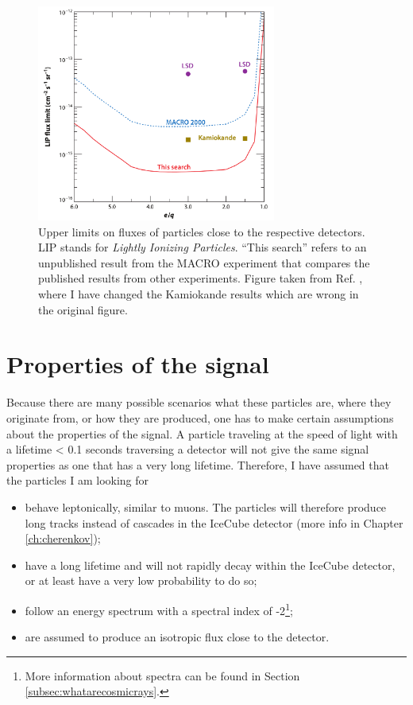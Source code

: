 \begin{figure}
\centering
\includegraphics[width=0.7\textwidth]{chapter2/img/upperlimits_changed.png}
\caption{Upper limits on fluxes of particles close to the respective detectors. LIP stands for \textit{Lightly Ionizing Particles}. ``This search'' refers to an unpublished result from the MACRO experiment that compares the published results from other experiments. Figure taken from Ref. \cite{Ambrosio:2004ub}, where I have changed the Kamiokande results which are wrong in the original figure.}
\label{fig:upperlimits}
\end{figure}


\section{Properties of the signal}
\label{sec:properties}
Because there are many possible scenarios what these particles are, where they originate from, or how they are produced, one has to make certain assumptions about the properties of the signal. A particle traveling at the speed of light with a lifetime < 0.1 seconds traversing a detector will not give the same signal properties as one that has a very long lifetime. Therefore, I have assumed that the particles I am looking for
\vspace{2mm}

\begin{itemize}
\item behave leptonically, similar to muons. The particles will therefore produce long tracks instead of cascades in the IceCube detector (more info in Chapter \ref{ch:cherenkov});
\item have a long lifetime and will not rapidly decay within the IceCube detector, or at least have a very low probability to do so;
\item follow an energy spectrum with a spectral index of -2\footnote{More information about spectra can be found in Section \ref{subsec:whatarecosmicrays}.};
\item are assumed to produce an isotropic flux close to the detector.
\end{itemize}
\vspace{2mm}

